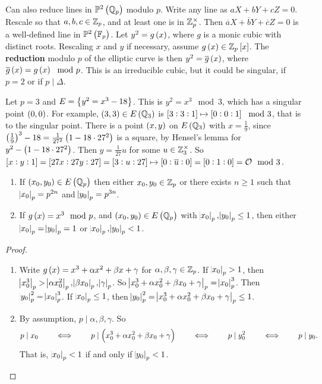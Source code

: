Can also reduce lines in $ \PP^2\br{\QQ_p} $ modulo $ p $. Write any line as $ aX + bY + cZ = 0 $. Rescale so that $ a, b, c \in \mathbb{Z}_p $, and at least one is in $ \mathbb{Z}_p^\times $. Then $ \overline{a}X + \overline{b}Y + \overline{c}Z = 0 $ is a well-defined line in $ \PP^2\br{\FF_p} $. Let $ y^2 = g\br{x} $, where $ g $ is a monic cubic with distinct roots. Rescaling $ x $ and $ y $ if necessary, assume $ g\br{x} \in \ZZ_p\sbr{x} $. The \textbf{reduction} modulo $ p $ of the elliptic curve is then $ y^2 = \overline{g}\br{x} $, where $ \overline{g}\br{x} = g\br{x} \mod p $. This is an irreducible cubic, but it could be singular, if $ p = 2 $ or if $ p \mid \Delta $.

\begin{example}
Let $ p = 3 $ and $ E = \cbr{y^2 = x^3 - 18} $. This is $ y^2 = x^3 \mod 3 $, which has a singular point $ \br{0, 0} $. For example, $ \br{3, 3} \in E\br{\QQ_3} $ is $ \sbr{3 : 3 : 1} \mapsto \sbr{0 : 0 : 1} \mod 3 $, that is to the singular point. There is a point $ \br{x, y} $ on $ E\br{\QQ_3} $ with $ x = \tfrac{1}{9} $, since $ \br{\tfrac{1}{9}}^3 - 18 = \tfrac{1}{27^2}\br{1 - 18 \cdot 27^2} $ is a square, by Hensel's lemma for $ y^2 - \br{1 - 18 \cdot 27^2} $. Then $ y = \tfrac{1}{27}u $ for some $ u \in \mathbb{Z}_3^\times $. So $ \sbr{x : y : 1} = \sbr{27x : 27y : 27} = \sbr{3 : u : 27} \mapsto \sbr{0 : \overline{u} : 0} = \sbr{0 : 1 : 0} = \OOO \mod 3 $.
\end{example}

\begin{lemma}
\hfill
\begin{enumerate}
\item If $ \br{x_0, y_0} \in E\br{\QQ_p} $ then either $ x_0, y_0 \in \mathbb{Z}_p $ or there exists $ n \ge 1 $ such that $ \abs{x_0}_p = p^{2n} $ and $ \abs{y_0}_p = p^{3n} $.
\item If $ g\br{x} = x^3 \mod p $, and $ \br{x_0, y_0} \in E\br{\QQ_p} $ with $ \abs{x_0}_p, \abs{y_0}_p \le 1 $, then either $ \abs{x_0}_p = \abs{y_0}_p = 1 $ or $ \abs{x_0}_p, \abs{y_0}_p < 1 $.
\end{enumerate}
\end{lemma}

\begin{proof}
\hfill
\begin{enumerate}
\item Write $ g\br{x} = x^3 + \alpha x^2 + \beta x + \gamma $ for $ \alpha, \beta, \gamma \in \mathbb{Z}_p $. If $ \abs{x_0}_p > 1 $, then $ \abs{x_0^3}_p > \abs{\alpha x_0^2}_p, \abs{\beta x_0}_p, \abs{\gamma}_p $. So $ \abs{x_0^3 + \alpha x_0^2 + \beta x_0 + \gamma}_p = \abs{x_0}_p^3 $. Then $ \abs{y_0}_p^2 = \abs{x_0}_p^3 $. If $ \abs{x_0}_p \le 1 $, then $ \abs{y_0}_p^2 = \abs{x_0^3 + \alpha x_0^2 + \beta x_0 + \gamma}_p \le 1 $.
\item By assumption, $ p \mid \alpha, \beta, \gamma $. So
$$ p \mid x_0 \qquad \iff \qquad p \mid \br{x_0^3 + \alpha x_0^2 + \beta x_0 + \gamma} \qquad \iff \qquad p \mid y_0^2 \qquad \iff \qquad p \mid y_0. $$
That is, $ \abs{x_0}_p < 1 $ if and only if $ \abs{y_0}_p < 1 $.
\end{enumerate}
\end{proof}

